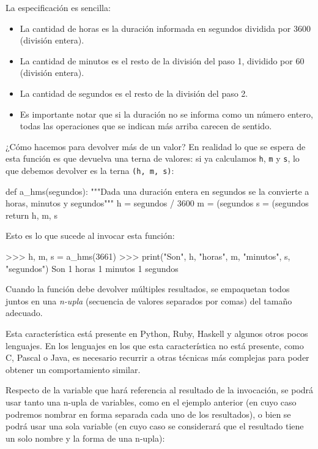 \begin{solucion}
La especificación es sencilla:
\begin{itemize}
\item La cantidad de horas es la duración informada en segundos dividida
por 3600 (división entera).
\item La cantidad de minutos es el resto de la división del paso 1,
dividido por 60 (división entera).
\item La cantidad de segundos es el resto de la división del paso 2.
\item Es importante notar que si la duración no se informa como un número
entero, todas las operaciones que se indican más arriba carecen de sentido.
\end{itemize}

¿Cómo hacemos para devolver más de un valor? En realidad lo que se espera
de esta función es que devuelva una terna de valores: si ya calculamos
\lstinline!h!, \lstinline!m! y \lstinline!s!, lo que debemos devolver
es la terna \lstinline+(h, m, s)+:

\begin{codigo-python-sn}
def a_hms(segundos):
   """Dada una duración entera en segundos
      se la convierte a horas, minutos y segundos"""
   h = segundos / 3600
   m = (segundos %
   s = (segundos %
   return h, m, s
\end{codigo-python-sn}
\end{solucion}

Esto es lo que sucede al invocar esta función:

\begin{codigo-python-sn}
>>> h, m, s = a_hms(3661)
>>> print("Son", h, "horas", m, "minutos", s, "segundos")
Son 1 horas 1 minutos 1 segundos
\end{codigo-python-sn}

\begin{sabias_que}
Cuando la función debe devolver múltiples resultados, se empaquetan todos juntos
en una \emph{n-upla} (secuencia de valores separados por comas) del tamaño adecuado.

Esta característica está presente en Python, Ruby, Haskell y algunos otros pocos
lenguajes.  En los lenguajes en los que esta característica no está
presente, como C, Pascal o Java, es necesario recurrir a otras
técnicas más complejas para poder obtener un comportamiento similar.
\end{sabias_que}

Respecto de la variable que hará referencia al resultado de la invocación,
se podrá usar tanto una n-upla de variables, como en el ejemplo anterior
(en cuyo caso podremos nombrar en forma separada cada uno de los resultados),
o bien se podrá usar una sola variable (en cuyo caso se considerará que
el resultado tiene un solo nombre y la forma de una n-upla):


